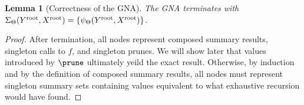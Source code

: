 \documentclass{article}
\newtheorem{lemma}{Lemma}
\newcommand{\killspace}{\vspace{-0.08in}}
\newcommand{\GNP}[1][\psi]{{#1}_{\Theta}}
\newcommand{\kdroot}[1]{#1^{\text{\rm root}}}
\begin{document}
\begin{lemma}[Correctness of the GNA]
  The GNA terminates with $\GNP[\Sigma](\kdroot{Y},\kdroot{X}) =
  \{\GNP(\kdroot{Y},\kdroot{X})\}$.
\end{lemma}
\killspace
\killspace
\begin{proof}
  After termination, all nodes represent composed summary results,
  singleton calls to $f$, and singleton prunes.  We will show later
  that values introduced by $\prune$ ultimately yeild the exact
  result.  Otherwise, by induction and by the definition of composed
  summary results, all nodes must represent singleton summary sets
  containing values equivalent to what exhaustive recursion would have
  found.
\end{proof}
\killspace
\end{document}
